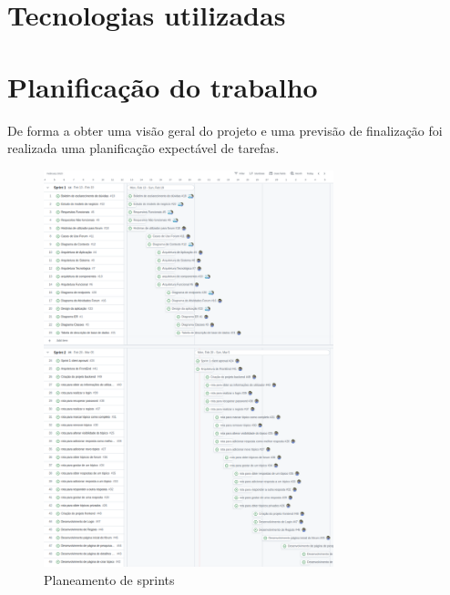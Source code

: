 \newpage

\section{Tecnologias utilizadas}



\newpage

\section{Planificação do trabalho}

De forma a obter uma visão geral do projeto e uma previsão de finalização foi realizada uma planificação 
expectável de tarefas.

\begin{figure}[htb]
    \centering
    
    \includegraphics[width=0.75\textwidth]{images/etapa1_sprint_planning.png}
    \caption{Planeamento de sprints}
    \label{fig:1}
\end{figure}



